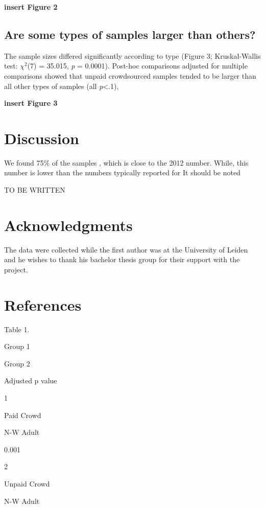 \documentclass[english,man]{apa6}
\newcounter{author}
\theoremstyle{definition}
\theoremstyle{definition}
\theoremstyle{remark}
\begin{document}
\textbf{insert Figure 2}

\subsection{Are some types of samples larger than
others?}\label{are-some-types-of-samples-larger-than-others}

The sample sizes differed significantly according to type (Figure 3;
Kruskal-Wallis test: \(\chi^2\)(7) = 35.015, \emph{p} = 0.0001).
Post-hoc comparisons adjusted for multiple comparisons showed that
unpaid crowdsourced samples tended to be larger than all other types of
samples (all \emph{p}\textless{}.1),

\textbf{insert Figure 3}

\section{Discussion}\label{discussion}

We found 75\% of the samples , which is close to the 2012 number. While,
this number is lower than the numbers typically reported for It should
be noted

TO BE WRITTEN

\section{Acknowledgments}\label{acknowledgments}

The data were collected while the first author was at the University of
Leiden and he wishes to thank his bachelor thesis group for their
support with the project.

\newpage

\section{References}\label{references}

\newpage

Table 1.

Group 1

Group 2

Adjusted p value

1

Paid Crowd

N-W Adult

0.001

2

Unpaid Crowd

N-W Adult
\end{document}
